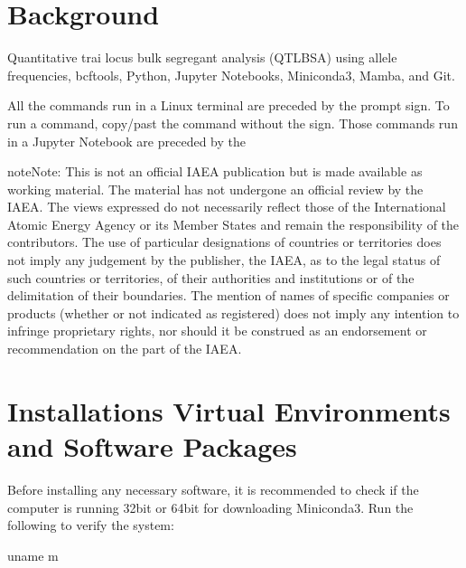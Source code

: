 \documentclass[letterpaper,10pt,english]{sphinxhowto}
\begin{document}
\pagestyle{plain}
\sphinxtableofcontents
\pagestyle{normal}
\label{\detokenize{index::doc}}



\section{Background}
\label{\detokenize{index:background}}
\sphinxAtStartPar
Quantitative trai locus \sphinxhyphen{} bulk segregant analysis (QTL\sphinxhyphen{}BSA) using allele frequencies, bcftools, Python, Jupyter Notebooks, Miniconda3, Mamba, and Git.

\sphinxAtStartPar
All the commands run in a Linux terminal are preceded by the \sphinxtitleref{\$} prompt sign. To run a command, copy/past the command without the \sphinxtitleref{\$} sign. Those commands run in a Jupyter Notebook are preceded by the 

\begin{sphinxadmonition}{note}{Note:}
\sphinxAtStartPar
This is not an official IAEA publication but is made available as working material. The material has not undergone an official review by the IAEA. The views expressed do not necessarily reflect those of the International Atomic Energy Agency or its Member States and remain the responsibility of the contributors. The use of particular designations of countries or territories does not imply any judgement by the publisher, the IAEA, as to the legal status of such countries or territories, of their authorities and institutions or of the delimitation of their boundaries. The mention of names of specific companies or products (whether or not indicated as registered) does not imply any intention to infringe proprietary rights, nor should it be construed as an endorsement or recommendation on the part of the IAEA.
\end{sphinxadmonition}


\section{Installations \sphinxhyphen{} Virtual Environments and Software Packages}
\label{\detokenize{index:installations-virtual-environments-and-software-packages}}
\sphinxAtStartPar
Before installing any necessary software, it is recommended to check if the computer is running 32\sphinxhyphen{}bit or 64\sphinxhyphen{}bit for downloading Miniconda3. Run the following to verify the system:

\begin{sphinxVerbatim}[commandchars=\\\{\}]
\PYGZdl{} uname \PYGZhy{}m
\end{sphinxVerbatim}
\end{document}
